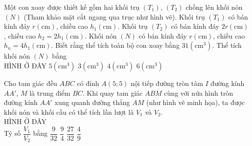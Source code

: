 \begin{ex}
	Một con xoay được thiết kế gồm hai khối trụ $(T_1)$, $(T_2)$ chồng lên khối nón $(N)$ (Tham khảo mặt cắt ngang qua trục như hình vẽ). Khối trụ $(T_1)$ có bán kính đáy $r(\mathrm{cm})$, chiều cao $h_1(\mathrm{cm})$. Khối trụ $(T_2)$ có bán kính đáy $2r(\mathrm{cm})$, chiều cao $h_2=2h_1(\mathrm{cm})$. Khối nón $(N)$ có bán kính đáy $r(\mathrm{cm})$, chiều cao $h_n=4h_1(\mathrm{cm})$. Biết rằng thể tích toàn bộ con xoay bằng $31(\mathrm{cm}^3)$. Thể tích khối nón $(N)$ bằng\\
	{\color{red}HÌNH Ở ĐÂY}
	\choice
	{$5(\mathrm{cm}^3)$}
	{$3(\mathrm{cm}^3)$}
	{\True $4(\mathrm{cm}^3)$}
	{$6(\mathrm{cm}^3)$}
\end{ex}
\begin{ex}
	Cho tam giác đều $ABC$ có đỉnh $A\left(5;5\right)$ nội tiếp đường tròn tâm $I$ đường kính $A{A}'$, $M$ là trung điểm $BC$. Khi quay tam giác $ABM$ cùng với nửa hình tròn đường kính $A{A}'$ xung quanh đường thẳng $AM$ (như hình vẽ minh họa), ta được khối nón và khối cầu có thể tích lần lượt là $V_1$ và $V_2$.\\
	{\color{red}HÌNH Ở ĐÂY}\\
	Tỷ số $\dfrac{V_1}{V_2}$ bằng
	\choice
	{\True $\dfrac{9}{32}$}
	{$\dfrac{9}{4}$}
	{$\dfrac{27}{32}$}
	{$\dfrac{4}{9}$}
\end{ex}
